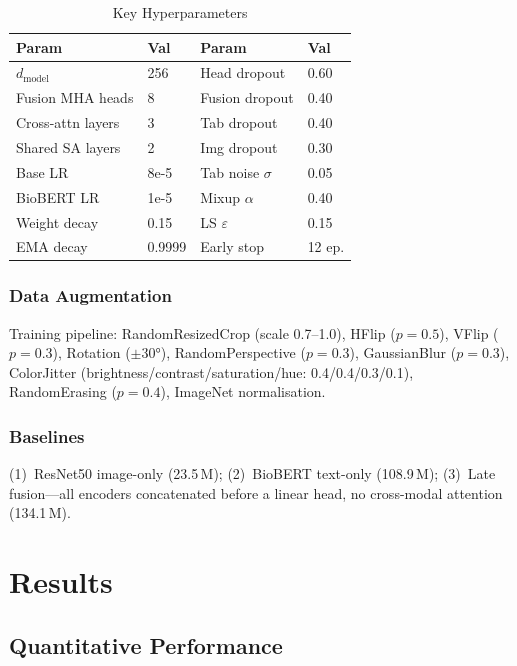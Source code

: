 \documentclass[conference]{IEEEtran}
\begin{document}
\begin{table}[h]
\centering\caption{Key Hyperparameters}
\small\setlength{\tabcolsep}{4pt}
\begin{tabular}{ll|ll}\toprule
\textbf{Param} & \textbf{Val} & \textbf{Param} & \textbf{Val}\\\midrule
$d_{\text{model}}$ & 256  & Head dropout      & 0.60\\
Fusion MHA heads   & 8    & Fusion dropout    & 0.40\\
Cross-attn layers  & 3    & Tab dropout       & 0.40\\
Shared SA layers   & 2    & Img dropout       & 0.30\\
Base LR            & 8e-5 & Tab noise $\sigma$& 0.05\\
BioBERT LR         & 1e-5 & Mixup $\alpha$    & 0.40\\
Weight decay       & 0.15 & LS $\varepsilon$  & 0.15\\
EMA decay          & 0.9999 & Early stop      & 12 ep.\\
\bottomrule
\end{tabular}
\end{table}

\subsubsection*{Data Augmentation}
Training pipeline: RandomResizedCrop (scale 0.7--1.0),
HFlip ($p\!=\!0.5$), VFlip ($p\!=\!0.3$), Rotation ($\pm30°$),
RandomPerspective ($p\!=\!0.3$), GaussianBlur ($p\!=\!0.3$), ColorJitter
(brightness/contrast/saturation/hue: 0.4/0.4/0.3/0.1),
RandomErasing ($p\!=\!0.4$), ImageNet normalisation.

\subsubsection*{Baselines}
(1)~ResNet50 image-only (23.5\,M); (2)~BioBERT text-only (108.9\,M);
(3)~Late fusion---all encoders concatenated before a linear head, no
cross-modal attention (134.1\,M).

\section{Results}

\subsection{Quantitative Performance}
\end{document}
